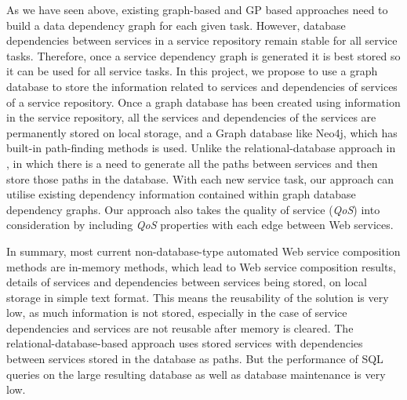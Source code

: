 As we have seen above, existing graph-based \cite{5} and GP based \cite{2} approaches need to build a data dependency graph for each given task. However, database dependencies between services in a service repository remain stable for all service tasks. Therefore, once a service dependency graph is generated it is best stored so it can be  used for all service tasks. In this project, we propose to use a graph database to store the information related to services and dependencies of services of a service repository. Once a graph database has been created using information in the service repository, all the services and dependencies of the services are permanently stored on local storage, and a Graph database like Neo4j, which has built-in path-finding methods is used. Unlike the relational-database approach in \cite{26},  in which there is a need to generate all the paths between services and then store those paths in the database. With each new service task, our approach can utilise existing dependency information contained within graph database dependency graphs. Our approach also takes the quality of service (\emph{QoS}) into consideration by including \emph{QoS} properties with each edge between Web services.\par   
 
In summary, most current non-database-type automated Web service composition methods \cite{2,5} are in-memory methods, which lead to Web service composition results, details of services and dependencies between services being stored, on local storage in simple text format. This means the reusability of the solution is very low, as much information is not stored, especially in the case of service dependencies and services are not reusable after memory is cleared. The relational-database-based approach \cite{26} uses stored services with dependencies between services stored in the database as paths. But the performance of SQL queries on the large resulting database as well as database maintenance is very low.\par